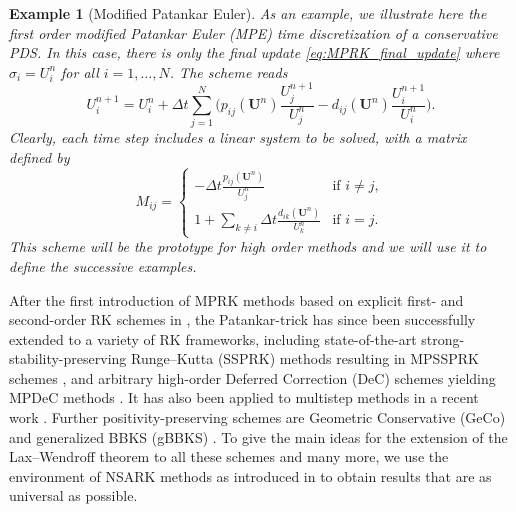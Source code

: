 \documentclass[final,11pt, times, linenumber, nopreprintline]{elsarticle}
\newtheorem{example}{Example}
\begin{document}
\begin{example}[Modified Patankar Euler]
As an example, we illustrate here the first order modified Patankar Euler (MPE) time discretization of a conservative PDS.
In this case, there is only the final update \eqref{eq:MPRK_final_update} where $\sigma_i=U^n_i$ for all $i=1,\dots,N$. The scheme reads
\begin{equation*}
        U_i^{n+1}=U_i^n+\Delta t \sum_{j=1}^N\biggl( p_{ij}(\mathbf{U}^{n})\frac{U_j^{n+1}}{U_j^{n}}-d_{ij}(\mathbf{U}^{n})\frac{U_i^{n+1}}{U_i^{n}}\biggr).\label{eq:MPE_final_update}
\end{equation*}
Clearly, each time step includes a linear system to be solved, with a matrix defined by
\begin{equation*}\label{eq:matrix_MPE}
    M_{ij}= \begin{cases}
        -\Delta t \frac{p_{ij}(\mathbf{U}^n)}{U_j^n} & \text{if } i\neq j,\\
        1+\sum_{k\neq i} \Delta t \frac{d_{ik}(\mathbf{U}^n)}{U_k^n} & \text{if } i= j.
    \end{cases}
\end{equation*}
This scheme will be the prototype for high order methods and we will use it to define the successive examples.
\end{example}

After the first introduction of MPRK methods based on explicit first- and second-order RK schemes in \cite{burchard_high-order_2003}, the Patankar-trick has since been successfully extended to a variety of RK frameworks, including state-of-the-art strong-stability-preserving Runge–Kutta (SSPRK) methods \cite{shu_efficient_1988} resulting in MPSSPRK schemes \cite{huang_positivity-preserving_2019}, and arbitrary high-order Deferred Correction (DeC) schemes \cite{dutt_spectral_2000} yielding MPDeC methods \cite{ciallella2022arbitrary}. It has also been applied to multistep methods in a recent work \cite{IMPV2025}. %
 Further positivity-preserving schemes are Geometric Conservative (GeCo) \cite{MCD2020} and generalized BBKS (gBBKS) \cite{AKM2020}. To give the main ideas for the extension of the Lax--Wendroff theorem to all these schemes and many more, we use the environment of NSARK methods as introduced in \cite{IzginThesis} to obtain results that are as universal as possible.
\end{document}
